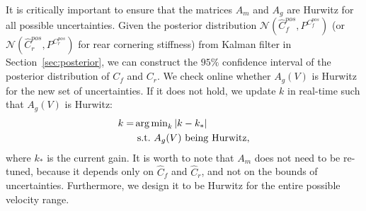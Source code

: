\documentclass[letterpaper, 10 pt, conference]{ieeeconf}
\begin{document}
It is critically important to ensure that the matrices $A_m$ and $A_g$ are Hurwitz for all possible uncertainties. Given the posterior distribution ${\mathcal{N}}(\hat{C}_f^{pos},P^{C_f^{pos}})$ (or ${\mathcal{N}}(\hat{C}_r^{pos},P^{C_r^{pos}})$ for rear cornering stiffness) from Kalman filter in Section~\ref{sec:posterior}, we can construct the $95\%$ confidence interval of the posterior distribution of $C_f$ and $C_r$. We check online whether $A_g(V)$ is Hurwitz for the new set of uncertainties. If it does not hold, we update $k$ in real-time such that $A_g(V)$ is Hurwitz:
\begin{align*}
k = &\operatorname{arg\,min}_{k} |k-k_*|\nonumber\\
& \ {\rm s.t. } \ A_g(V) \ {\rm being \ Hurwitz},
\end{align*}
where $k_*$ is the current gain.
It is worth to note that $A_m$ does not need to be re-tuned, because it depends only on $\hat{C}_f$ and $\hat{C}_r$, and not on the bounds of uncertainties.
Furthermore, we design  it to be Hurwitz for the entire possible velocity range.
 
\end{document}
